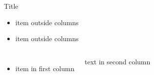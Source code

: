 \documentclass{beamer}
\begin{document}
\begin{frame}[t]{Title}
\begin{itemize}
    \item item outside columns
    \item item outside columns
\end{itemize}

\begin{columns}[totalwidth=\textwidth]
    \begin{itemize}
        \item item in first column
    \end{itemize}

    text in second column
\end{columns}
\end{frame}
\end{document}
